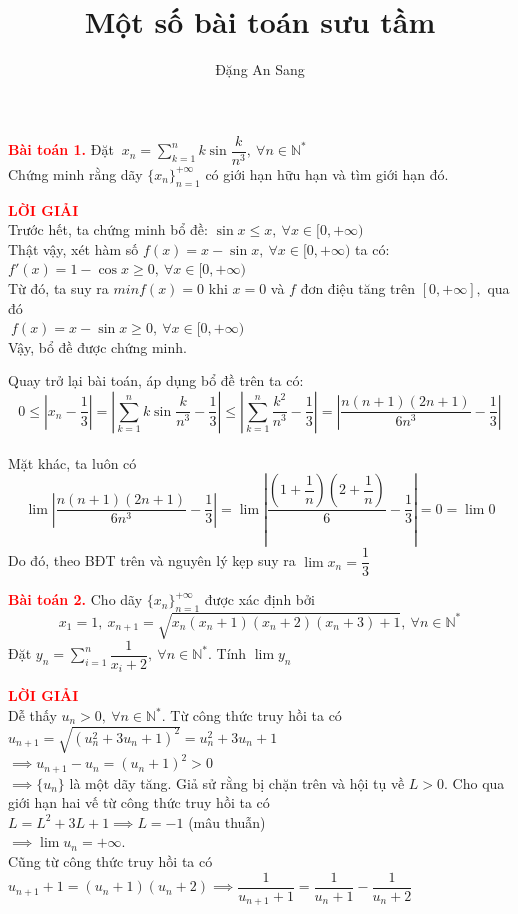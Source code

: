 \documentclass[a4paper, 12pt]{article}
\title{\textbf{Một số bài toán sưu tầm}}
\author{Đặng An Sang}
\date{}
\numberwithin{equation}{section}
\begin{document}
	\maketitle
    
	\begin{BoxRed}
	\textbf{\textcolor{red}{Bài toán 1.}}
		Đặt $\ x_n = \sum\limits_{k = 1}^{n} {k \sin \dfrac{k}{n^3}}, \ \forall n \in \mathbb{N}^* \quad $
		\\Chứng minh rằng dãy $\{ x_n \}_{n=1}^{+\infty}$ có giới hạn hữu hạn và tìm giới hạn đó.\\
	\end{BoxRed}
	\textbf{\textcolor{red}{LỜI GIẢI}} \\
	Trước hết, ta chứng minh bổ đề: $\sin x \leq x, \ \forall x \in [0, +\infty)$\\
	Thật vậy, xét hàm số $f(x) = x - \sin x, \ \forall x \in [0, +\infty)$ ta có:\\
	$f'(x) = 1 - \cos x \geq 0, \ \forall x \in [0, +\infty)$ \\
	Từ đó, ta suy ra $min f(x) = 0$ khi $x = 0$ và $f$ đơn điệu tăng trên $[0, +\infty],$ qua đó \\$ \ f(x) = x - \sin x \geq 0, \ \forall x \in [0, +\infty)$
	\\Vậy, bổ đề được chứng minh.
	
	Quay trở lại bài toán, áp dụng bổ đề trên ta có:
	\[0 \leq \left| x_n - \dfrac{1}{3} \right| = \left| \sum_{k=1}^{n} k \sin \dfrac{k}{n^3} - \dfrac{1}{3} \right| 
	\leq \left| \sum_{k=1}^{n} \dfrac{k^2}{n^3} - \dfrac{1}{3} \right| 
	= \left| \dfrac{n(n+1)(2n+1)}{6n^3} - \dfrac{1}{3} \right|\]
	\\Mặt khác, ta luôn có 
	\[\lim \left| \dfrac{n(n+1)(2n+1)}{6n^3} - \dfrac{1}{3} \right|
	= \lim \left| \dfrac{\left(1 + \dfrac{1}{n}\right)\left(2 + \dfrac{1}{n}\right)}{6} - \dfrac{1}{3} \right| = 0 = \lim 0 \]
	Do đó, theo BĐT trên và nguyên lý kẹp suy ra $\lim x_n = \dfrac{1}{3}$
    \newpage
    \begin{BoxRed}
	\textbf{\textcolor{red}{Bài toán 2.}}
		Cho dãy $\{ x_n \}_{n=1}^{+\infty}$ được xác định bởi $$x_1 = 1, \ x_{n+1} = \sqrt{x_n(x_n + 1)(x_n + 2)(x_n + 3) + 1}, \ \forall n \in \mathbb{N}^*$$
		Đặt $y_n = \sum\limits_{i=1}^n \dfrac{1}{x_i + 2}, \ \forall n \in \mathbb{N}^*$. Tính $\lim y_n$
	\end{BoxRed}
	\textbf{\textcolor{red}{LỜI GIẢI}} \\
    Dễ thấy $u_n > 0, \ \forall n \in \mathbb{N}^*$. Từ công thức truy hồi ta có\\ 
	$u_{n+1} = \sqrt{(u_n^2 + 3u_n + 1)^2} = u_n^2 + 3u_n + 1$\\
	$\implies u_{n+1} - u_n = (u_n + 1)^2 > 0$\\
	$\implies \{u_n\}$ là một dãy tăng. Giả sử rằng bị chặn trên và hội tụ về $L > 0$. Cho qua giới hạn hai vế từ công thức truy hồi ta có\\
	$ L = L^2 + 3L + 1 \implies L = -1$ (mâu thuẫn)\\
	$\implies \lim u_n = +\infty.$ \\
	Cũng từ công thức truy hồi ta có\\ 
	$u_{n+1} + 1 = (u_n + 1)(u_n + 2) \implies \dfrac{1}{u_{n+1} + 1} = \dfrac{1}{u_n + 1} - \dfrac{1}{u_n + 2}$
	
\end{document}

